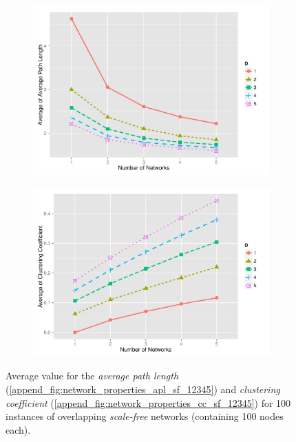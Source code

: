 \documentclass[preprint,number]{elsarticle}
\begin{document}
        \begin{figure}[H]
          \centering
          \begin{subfigure}{.5\linewidth}
		\centering
		\includegraphics[width=1\linewidth]{"../analysis/pdf/network_properties_apl_line_sf_12345"}
		\caption{}
		\label{fig:network_properties_apl_line_sf_12345}
	\end{subfigure}%
	\begin{subfigure}{.5\linewidth}
		\centering
		\includegraphics[width=1\linewidth]{"../analysis/pdf/network_properties_cc_line_sf_12345"}
		\caption{}
		\label{fig:network_properties_cc_line_sf_12345}
	\end{subfigure}
	\begin{minipage}{0.9\textwidth}
		\vspace{0.2cm}
		\caption{Average value for the \textit{average path length} (\ref{append_fig:network_properties_apl_sf_12345}) and \textit{clustering coefficient} (\ref{append_fig:network_properties_cc_sf_12345}) for 100 instances of overlapping \textit{scale-free} networks (containing 100 nodes each).}
		\label{fig:network_properties_line_sf}
	\end{minipage}
        \end{figure}
\end{document}
